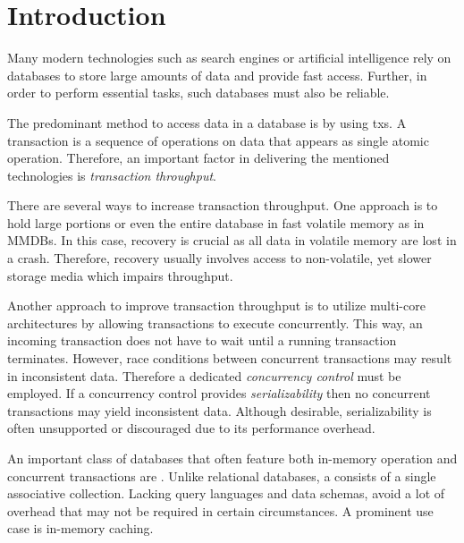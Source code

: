 \chapter{Introduction}
\label{ch:intro}



Many modern technologies such as search engines or artificial intelligence rely
on databases to store large amounts of data and provide fast access. Further, in
order to perform essential tasks, such databases must also be reliable.

The predominant method to access data in a database is by using \glspl{tx}. A
transaction is a sequence of operations on data that appears as single atomic
operation. Therefore, an important factor in delivering the mentioned
technologies is \textit{transaction throughput}.

There are several ways to increase transaction throughput. One approach is to
hold large portions or even the entire database in fast volatile memory as in
\acp{MMDB}. In this case, recovery is crucial as all data in volatile memory are
lost in a crash. Therefore, recovery usually involves access to non-volatile,
yet slower storage media which impairs throughput.

Another approach to improve transaction throughput is to utilize multi-core
architectures by allowing transactions to execute concurrently. This way, an
incoming transaction does not have to wait until a running transaction
terminates. However, race conditions between concurrent transactions may result
in inconsistent data. Therefore a dedicated \textit{concurrency control} must be
employed. If a concurrency control provides \textit{serializability} then no
concurrent transactions may yield inconsistent data. Although desirable,
serializability is often unsupported or discouraged due to its performance
overhead.

An important class of databases that often feature both in-memory operation and
concurrent transactions are \textit{\kvsp}. Unlike relational databases, a \kvs
consists of a single associative collection. Lacking query languages and data
schemas, \kvsp avoid a lot of overhead that may not be required in certain
circumstances. A prominent use case is in-memory caching.


